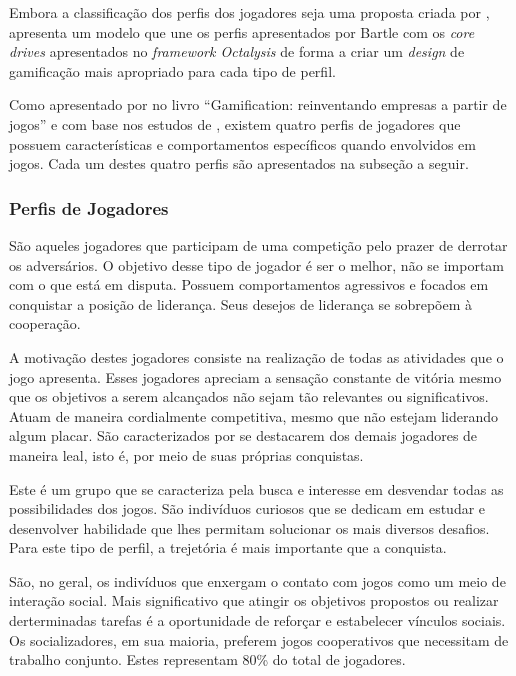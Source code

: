 
Embora a classificação dos perfis dos jogadores seja uma proposta criada por ,  apresenta um modelo
que une os perfis apresentados por Bartle com os \textit{core drives} apresentados no \textit{framework Octalysis} de forma a criar um \textit{design} de gamificação
mais apropriado para cada tipo de perfil.

Como apresentado por  no livro ``Gamification: reinventando empresas a partir de jogos'' e com base nos estudos de , 
existem quatro perfis de jogadores que possuem características e comportamentos específicos quando envolvidos em jogos. Cada um destes quatro perfis são apresentados na
subseção a seguir.

\subsubsection{Perfis de Jogadores} 

São aqueles jogadores que participam de uma competição pelo prazer de derrotar os adversários. O objetivo desse tipo de jogador é ser o melhor, não 
se importam com o que está em disputa. Possuem comportamentos agressivos e focados em conquistar a posição de liderança. Seus desejos de liderança se 
sobrepõem à cooperação.

A motivação destes jogadores consiste na realização de todas as atividades que o jogo apresenta. Esses jogadores apreciam a sensação constante
de vitória mesmo que os objetivos a serem alcançados não sejam tão relevantes ou significativos. Atuam de maneira cordialmente competitiva, mesmo que não estejam
liderando algum placar. São caracterizados por se destacarem dos demais jogadores de maneira leal, isto é, por meio de suas próprias conquistas.

Este é um grupo que se caracteriza pela busca e interesse em desvendar todas as possibilidades dos jogos. São indivíduos curiosos que se dedicam em estudar
e desenvolver habilidade que lhes permitam solucionar os mais diversos desafios. Para este tipo de perfil, a trejetória é mais importante que a conquista.

São, no geral, os indivíduos que enxergam o contato com jogos como um meio de interação social. Mais significativo que atingir os objetivos propostos ou
realizar derterminadas tarefas é a oportunidade de reforçar e estabelecer vínculos sociais. Os socializadores, em sua maioria, preferem jogos cooperativos
que necessitam de trabalho conjunto. Estes representam 80\% do total de jogadores.

